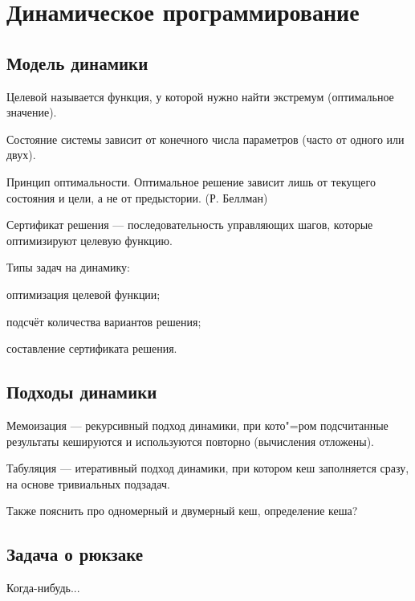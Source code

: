 \section{Динамическое программирование}

\subsection{Модель динамики}

{\bold Целевой} называется функция, у которой нужно найти {\ital экстремум {\color{desc}(оптимальное значение)}}.

{\bold Состояние} системы зависит от конечного числа {\ital параметров {\color{desc} (часто от одного или двух)}}.
\begin{theorem}
{\bold Принцип оптимальности}. Оптимальное решение зависит лишь от текущего состояния и цели, а не от предыстории. {\ital\color{desc}(Р. Беллман)}
\end{theorem}
{\bold Сертификат} {\ital решения} --- последовательность управляющих шагов, которые оптимизируют целевую функцию.

{\ital Типы} задач на динамику:

\begin{list*}
\item оптимизация целевой функции;
\item подсчёт количества вариантов решения;
\item составление сертификата решения.
\end{list*}

\subsection{Подходы динамики}

{\bold Мемоизация} --- {\ital рекурсивный} подход динамики, при кото"=ром подсчитанные результаты {\ital кешируются} и используются повторно {\ital\color{desc}(вычисления отложены)}.

{\bold Табуляция} --- {\ital итеративный} подход динамики, при котором кеш заполняется сразу, на основе тривиальных подзадач.

Также пояснить про одномерный и двумерный кеш, определение кеша?

\subsection{Задача о рюкзаке}

Когда-нибудь...

